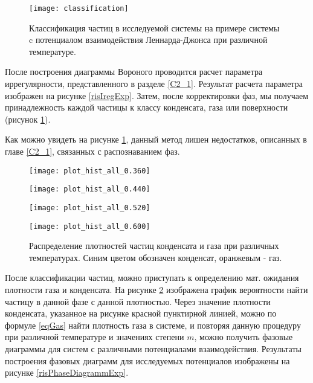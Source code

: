 \begin{figure}[h]
\begin{center}
\texttt{[image: classification]}
\caption{Классификация частиц в исследуемой системы на примере системы c потенциалом взаимодействия Леннарда-Джонса при различной температуре.}
\label{risClassExp}
\end{center}
\end{figure}

После построения диаграммы Вороного проводится расчет параметра иррегулярности, представленного в разделе \ref{C2_1}. Результат расчета параметра изображен на рисунке \ref{risIregExp}. Затем, после корректировки фаз, мы получаем принадлежность каждой частицы к классу конденсата, газа или поверхности (рисунок \ref{risClassExp}).

Как можно увидеть на рисунке \ref{risClassExp}, данный метод лишен недостатков, описанных в главе \ref{C2_1}, связанных с распознаванием фаз.

\begin{figure}[h]
\begin{center}

\begin{minipage}[h]{0.45\linewidth}
\texttt{[image: plot\_hist\_all\_0.360]}
\end{minipage}
\begin{minipage}[h]{0.45\linewidth}
\texttt{[image: plot\_hist\_all\_0.440]}
\end{minipage}

\begin{minipage}[h]{0.45\linewidth}
\texttt{[image: plot\_hist\_all\_0.520]}
\end{minipage}
\begin{minipage}[h]{0.45\linewidth}
\texttt{[image: plot\_hist\_all\_0.600]}
\end{minipage}
\caption{Распределение плотностей частиц конденсата и газа при различных температурах. Синим цветом обозначен конденсат, оранжевым  - газ.}
\label{risRhoM}
\end{center}
\end{figure}

После классификации частиц, можно приступать к определению мат. ожидания плотности газа и конденсата. На рисунке \ref{risRhoM} изображена график вероятности найти частицу в данной фазе с данной плотностью. Через значение плотности конденсата, указанное на рисунке красной пунктирной линией, можно по формуле \ref{eqGas} найти плотность газа в системе, и повторяя данную процедуру при различной температуре и значениях степени $m$, можно получить фазовые диаграммы для систем с различными потенциалами взаимодействия. Результаты построения фазовых диаграмм для исследуемых потенциалов изображены на рисунке \ref{risPhaseDiagrammExp}.

